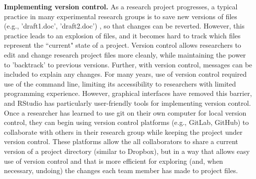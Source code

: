 \documentclass[pdftex,english,11pt,parskip=half]{scrartcl}
\begin{document}
\textbf{Implementing version control.} As a research project progresses, a typical practice in many experimental research groups is to save new versions of files (e.g., 'draft1.doc', 'draft2.doc') \cite{bryan2018excuse}, so that changes can be reverted. However, this practice leads to an explosion of files, and it becomes hard to track which files represent the ``current" state of a project. Version control allows researchers to edit and change research project files more cleanly, while maintaining the power to 'backtrack' to previous versions. Further, with version control, messages can be included to explain any changes. For many years, use of version control required use of the command line,
limiting its accessibility to researchers with limited programming experience.
However, graphical interfaces have removed this barrier, and RStudio has 
particularly user-friendly tools for implementing version control. Once a researcher has learned to use git on their own computer for local version control, they can begin using version control 
platforms (e.g., GitLab, GitHub) to collaborate with others in their research
group while keeping the project under version control. These platforms allow
the all collaborators to share a current version of a project directory 
(similar to Dropbox), but in a way that allows easy use of version control 
and that is more efficient for exploring (and, when necessary, undoing) the changes 
each team member has made to project files. 
\end{document}
